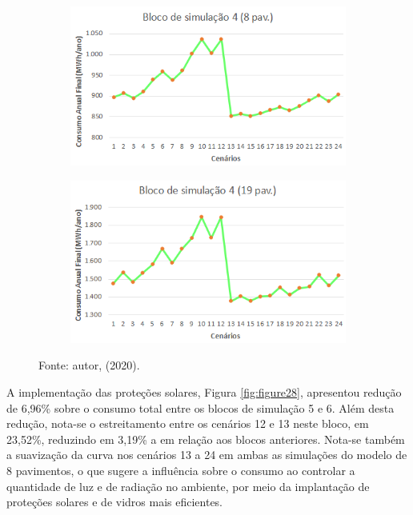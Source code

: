 \begin{figure}[H]
    \centering
    \caption{Gráficos dos blocos de simulação de PAF\textsubscript{T} dos modelos genérico de 8 (esq.) e 19 pavimentos (dir.).}
    \begin{subfigure}[b]{0.49\textwidth}
        \includegraphics[width=\textwidth]{figures/result/fig33-bloco4.png}
    \end{subfigure}
    \begin{subfigure}[b]{0.49\textwidth}
        \includegraphics[width=\textwidth]{figures/result/fig34-bloco4.png}
    \end{subfigure}
    \begin{flushleft}
        \par \small Fonte: autor, (2020).
    \end{flushleft}
    \label{fig:figure27}
\end{figure}
A implementação das proteções solares, Figura \ref{fig:figure28}, apresentou redução de 6,96\% sobre o consumo total entre os blocos de simulação 5 e 6. Além desta redução, nota-se o estreitamento entre os cenários 12 e 13 neste bloco, em 23,52\%, reduzindo em 3,19\% a em relação aos blocos anteriores. Nota-se também a suavização da curva nos cenários 13 a 24 em ambas as simulações do modelo de 8 pavimentos, o que sugere a influência sobre o consumo ao controlar a quantidade de luz e de radiação no ambiente, por meio da implantação de proteções solares e de vidros mais eficientes.
